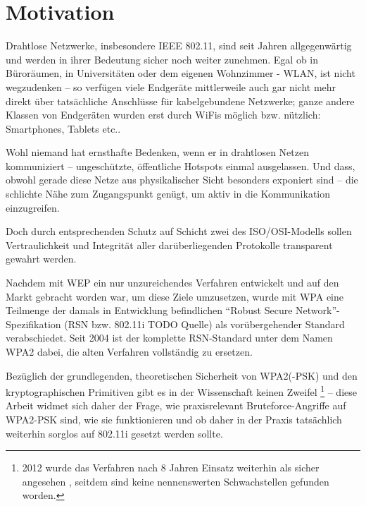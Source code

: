 \section{Motivation}
Drahtlose Netzwerke, insbesondere IEEE 802.11, sind seit Jahren allgegenwärtig und werden in ihrer Bedeutung sicher noch weiter zunehmen. Egal ob in Büroräumen, in Universitäten oder dem eigenen Wohnzimmer - WLAN, ist nicht wegzudenken -- so verfügen viele Endgeräte mittlerweile auch gar nicht mehr direkt über tatsächliche Anschlüsse für kabelgebundene Netzwerke; ganze andere Klassen von Endgeräten wurden erst durch WiFis möglich bzw. nützlich: Smartphones, Tablets etc..

Wohl niemand hat ernsthafte Bedenken, wenn er in drahtlosen Netzen kommuniziert -- ungeschützte, öffentliche Hotspots einmal ausgelassen. Und dass, obwohl gerade diese Netze aus physikalischer Sicht besonders exponiert sind -- die schlichte Nähe zum Zugangspunkt genügt, um aktiv in die Kommunikation einzugreifen.

Doch durch entsprechenden Schutz auf Schicht zwei des ISO/OSI-Modells sollen Vertraulichkeit und Integrität aller darüberliegenden Protokolle transparent gewahrt werden.

Nachdem mit WEP ein nur unzureichendes Verfahren entwickelt und auf den Markt gebracht worden war, um diese Ziele umzusetzen, wurde mit WPA eine Teilmenge der damals in Entwicklung befindlichen \enquote{Robust Secure Network}-Spezifikation (RSN bzw. 802.11i TODO Quelle) als vorübergehender Standard verabschiedet. Seit 2004 ist der komplette RSN-Standard unter dem Namen WPA2 dabei, die alten Verfahren vollständig zu ersetzen.	

Bezüglich der grundlegenden, theoretischen Sicherheit von WPA2(-PSK) und den kryptographischen Primitiven gibt es in der Wissenschaft keinen Zweifel \footnote{2012 wurde das Verfahren nach 8 Jahren Einsatz weiterhin als sicher angesehen \cite{kumkar2012}, seitdem sind keine nennenswerten Schwachstellen gefunden worden.} -- diese Arbeit widmet sich daher der Frage, wie praxisrelevant Bruteforce-Angriffe auf WPA2-PSK sind, wie sie funktionieren und ob daher in der Praxis tatsächlich weiterhin sorglos auf 802.11i gesetzt werden sollte.
